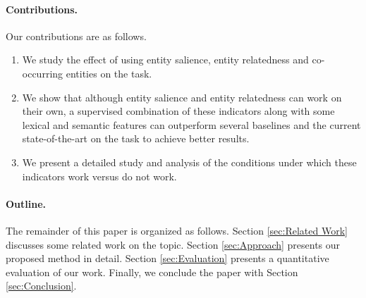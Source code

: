 \documentclass[sigconf,authordraft]{acmart}
\begin{document}

\paragraph{\textbf{Contributions.}} 


Our contributions are as follows.
\begin{enumerate}

    \item We study the effect of using entity salience, entity relatedness and co-occurring entities on the task.
    \item We show that although entity salience and entity relatedness can work on their own, a supervised combination of these indicators along with some lexical and semantic features can outperform several baselines and the current state-of-the-art on the task to achieve better results.
    \item We present a detailed study and analysis of the conditions under which these indicators work versus do not work. 
\end{enumerate}

\paragraph{\textbf{Outline.}} The remainder of this paper is organized as follows. Section \ref{sec:Related Work} discusses some related work on the topic. Section \ref{sec:Approach} presents our proposed method in detail. Section \ref{sec:Evaluation} presents a quantitative evaluation of our work. Finally, we conclude the paper with Section \ref{sec:Conclusion}.
\end{document}
